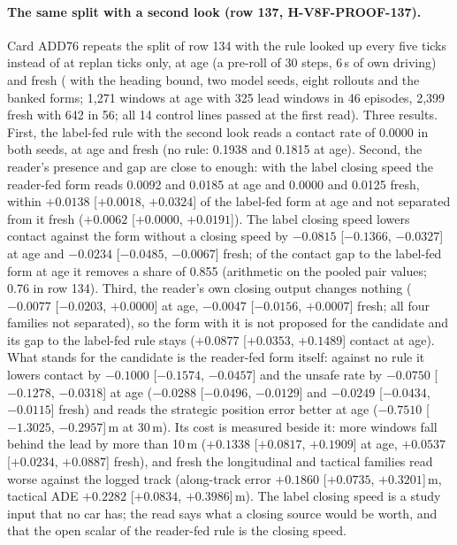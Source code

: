 \paragraph{The same split with a second look (row 137, H-V8F-PROOF-137).} Card ADD76 repeats the split of row 134 with the rule looked up every five ticks instead of at replan ticks only, at age (a pre-roll of 30 steps, 6\,s of own driving) and fresh ( with the heading bound, two model seeds, eight rollouts and the banked forms; 1,271 windows at age with 325 lead windows in 46 episodes, 2,399 fresh with 642 in 56; all 14 control lines passed at the first read). Three results. First, the label-fed rule with the second look reads a contact rate of 0.0000 in both seeds, at age and fresh (no rule: 0.1938 and 0.1815 at age). Second, the reader's presence and gap are close to enough: with the label closing speed the reader-fed form reads 0.0092 and 0.0185 at age and 0.0000 and 0.0125 fresh, within $+0.0138$ [$+0.0018$, $+0.0324$] of the label-fed form at age and not separated from it fresh ($+0.0062$ [$+0.0000$, $+0.0191$]). The label closing speed lowers contact against the form without a closing speed by $-0.0815$ [$-0.1366$, $-0.0327$] at age and $-0.0234$ [$-0.0485$, $-0.0067$] fresh; of the contact gap to the label-fed form at age it removes a share of 0.855 (arithmetic on the pooled pair values; 0.76 in row 134). Third, the reader's own closing output changes nothing ($-0.0077$ [$-0.0203$, $+0.0000$] at age, $-0.0047$ [$-0.0156$, $+0.0007$] fresh; all four families not separated), so the form with it is not proposed for the candidate and its gap to the label-fed rule stays ($+0.0877$ [$+0.0353$, $+0.1489$] contact at age). What stands for the candidate is the reader-fed form itself: against no rule it lowers contact by $-0.1000$ [$-0.1574$, $-0.0457$] and the unsafe rate by $-0.0750$ [$-0.1278$, $-0.0318$] at age ($-0.0288$ [$-0.0496$, $-0.0129$] and $-0.0249$ [$-0.0434$, $-0.0115$] fresh) and reads the strategic position error better at age ($-0.7510$ [$-1.3025$, $-0.2957$]\,m at 30\,m). Its cost is measured beside it: more windows fall behind the lead by more than 10\,m ($+0.1338$ [$+0.0817$, $+0.1909$] at age, $+0.0537$ [$+0.0234$, $+0.0887$] fresh), and fresh the longitudinal and tactical families read worse against the logged track (along-track error $+0.1860$ [$+0.0735$, $+0.3201$]\,m, tactical ADE $+0.2282$ [$+0.0834$, $+0.3986$]\,m). The label closing speed is a study input that no car has; the read says what a closing source would be worth, and that the open scalar of the reader-fed rule is the closing speed.


